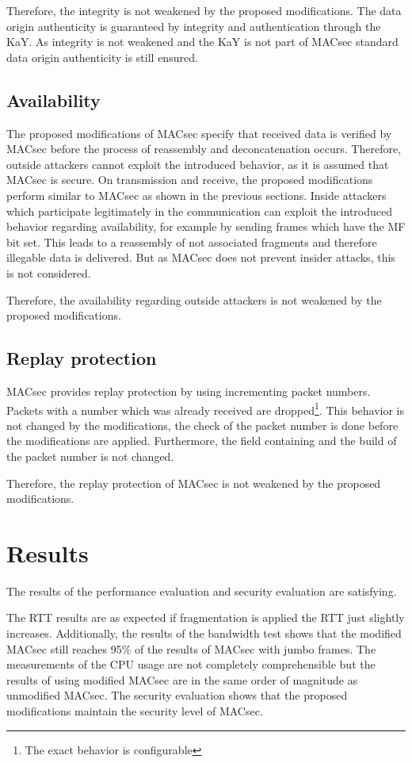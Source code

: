 Therefore, the integrity is not weakened by the proposed modifications.
The data origin authenticity is guaranteed by integrity and authentication through the \acrlong{KaY}.
As integrity is not weakened and the \acrlong{KaY} is not part of \gls{MACsec} standard data origin authenticity is still ensured.

\subsection{Availability}
The proposed modifications of \gls{MACsec} specify that received data is verified by \gls{MACsec} before the process of reassembly and deconcatenation occurs.
Therefore, outside attackers cannot exploit the introduced behavior, as it is assumed that \gls{MACsec} is secure.
On transmission and receive, the proposed modifications perform similar to \gls{MACsec} as shown in the previous sections.
Inside attackers which participate legitimately in the communication can exploit the introduced behavior regarding availability, for example by sending frames which have the \gls{MF} bit set.
This leads to a reassembly of not associated fragments and therefore illegable data is delivered.
But as \gls{MACsec} does not prevent insider attacks, this is not considered.

Therefore, the availability regarding outside attackers is not weakened by the proposed modifications.

\subsection{Replay protection}
\gls{MACsec} provides replay protection by using incrementing packet numbers.
Packets with a number which was already received are dropped\footnote{The exact behavior is configurable}.
This behavior is not changed by the modifications, the check of the packet number is done before the modifications are applied.
Furthermore, the field containing and the build of the packet number is not changed.

Therefore, the replay protection of \gls{MACsec} is not weakened by the proposed modifications.
\pagebreak
\section{Results}
The results of the performance evaluation and security evaluation are satisfying.

The \gls{RTT} results are as expected if fragmentation is applied the \gls{RTT} just slightly increases.
Additionally, the results of the bandwidth test shows that the modified \gls{MACsec} still reaches 95\% of the results of \gls{MACsec} with jumbo frames.
The measurements of the CPU usage are not completely comprehensible but the results of using modified \gls{MACsec} are in the same order of magnitude as unmodified \gls{MACsec}.
The security evaluation shows that the proposed modifications maintain the security level of \gls{MACsec}.

